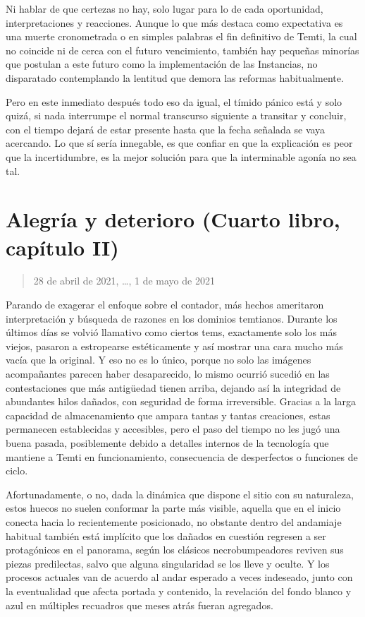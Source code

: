 \documentclass[
]{book}
\begin{document}
Ni hablar de que certezas no hay, solo lugar para lo de cada oportunidad, interpretaciones y reacciones. Aunque lo que más destaca como expectativa es una muerte cronometrada o en simples palabras el fin definitivo de Temti, la cual no coincide ni de cerca con el futuro vencimiento, también hay pequeñas minorías que postulan a este futuro como la implementación de las Instancias, no disparatado contemplando la lentitud que demora las reformas habitualmente.

Pero en este inmediato después todo eso da igual, el tímido pánico está y solo quizá, si nada interrumpe el normal transcurso siguiente a transitar y concluir, con el tiempo dejará de estar presente hasta que la fecha señalada se vaya acercando. Lo que sí sería innegable, es que confiar en que la explicación es peor que la incertidumbre, es la mejor solución para que la interminable agonía no sea tal.

\hypertarget{alegruxeda-y-deterioro-cuarto-libro-capuxedtulo-ii}{%
\section{Alegría y deterioro (Cuarto libro, capítulo II)}\label{alegruxeda-y-deterioro-cuarto-libro-capuxedtulo-ii}}

\begin{quote}
28 de abril de 2021, \ldots, 1 de mayo de 2021
\end{quote}

Parando de exagerar el enfoque sobre el contador, más hechos ameritaron interpretación y búsqueda de razones en los dominios temtianos. Durante los últimos días se volvió llamativo como ciertos tems, exactamente solo los más viejos, pasaron a estropearse estéticamente y así mostrar una cara mucho más vacía que la original. Y eso no es lo único, porque no solo las imágenes acompañantes parecen haber desaparecido, lo mismo ocurrió sucedió en las contestaciones que más antigüedad tienen arriba, dejando así la integridad de abundantes hilos dañados, con seguridad de forma irreversible. Gracias a la larga capacidad de almacenamiento que ampara tantas y tantas creaciones, estas permanecen establecidas y accesibles, pero el paso del tiempo no les jugó una buena pasada, posiblemente debido a detalles internos de la tecnología que mantiene a Temti en funcionamiento, consecuencia de desperfectos o funciones de ciclo.

Afortunadamente, o no, dada la dinámica que dispone el sitio con su naturaleza, estos huecos no suelen conformar la parte más visible, aquella que en el inicio conecta hacia lo recientemente posicionado, no obstante dentro del andamiaje habitual también está implícito que los dañados en cuestión regresen a ser protagónicos en el panorama, según los clásicos necrobumpeadores reviven sus piezas predilectas, salvo que alguna singularidad se los lleve y oculte. Y los procesos actuales van de acuerdo al andar esperado a veces indeseado, junto con la eventualidad que afecta portada y contenido, la revelación del fondo blanco y azul en múltiples recuadros que meses atrás fueran agregados.
\end{document}
